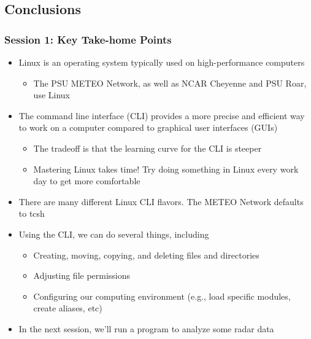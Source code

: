 \documentclass[hyperref,pdfa,unicode,utf8,usepdftitle]{beamer}
\begin{document}
\subsection{Conclusions}

\begin{frame}
  \frametitle{Session 1: Key Take-home Points}
  \begin{itemize}
  \item Linux is an operating system typically used on
    high-performance computers
    \begin{itemize}
    \item The PSU METEO Network, as well as NCAR Cheyenne and PSU
      Roar, use Linux
    \end{itemize}
  \item The command line interface (CLI) provides a more precise and
    efficient way to work on a computer compared to graphical user
    interfaces (GUIs)
    \begin{itemize}
    \item The tradeoff is that the learning curve for the CLI is
      steeper
    \item Mastering Linux takes time! Try doing something in Linux
      every work day to get more comfortable
    \end{itemize}
  \item There are many different Linux CLI flavors. The METEO Network
    defaults to tcsh
  \item Using the CLI, we can do several things, including
    \begin{itemize}
    \item Creating, moving, copying, and deleting files and
      directories
    \item Adjusting file permissions
    \item Configuring our computing environment (e.g., load specific
      modules, create aliases, etc)
    \end{itemize}
  \item \alert{In the next session, we’ll run a program to analyze
      some radar data}
  \end{itemize}
\end{frame}
\end{document}
